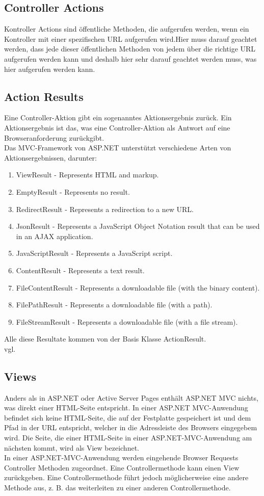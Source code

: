 {\subsection{Controller Actions}
\label{sec:controller_actions}
Kontroller Actions sind öffentliche Methoden, die aufgerufen werden, wenn ein Kontroller mit einer spezifischen URL aufgerufen wird.Hier muss darauf geachtet werden, dass jede dieser öffentlichen Methoden von jedem über die richtige URL aufgerufen werden kann und deshalb hier sehr darauf geachtet werden muss, was hier aufgerufen werden kann. 
\subsection{Action Results}
\label{sec:controller_actions_results}
Eine Controller-Aktion gibt ein sogenanntes Aktionsergebnis zurück. Ein Aktionsergebnis ist das, was eine Controller-Aktion als Antwort auf eine Browseranforderung zurückgibt.\\Das MVC-Framework von ASP.NET unterstützt verschiedene Arten von Aktionsergebnissen, darunter:
\begin{enumerate}
\item ViewResult - Represents HTML and markup.
\item EmptyResult - Represents no result.
\item RedirectResult - Represents a redirection to a new URL.
\item JsonResult - Represents a JavaScript Object Notation result that can be used in an AJAX application.
\item JavaScriptResult - Represents a JavaScript script.
\item ContentResult - Represents a text result.
\item FileContentResult - Represents a downloadable file (with the binary content).
\item FilePathResult - Represents a downloadable file (with a path).
\item FileStreamResult - Represents a downloadable file (with a file stream).
\end{enumerate}
Alle diese Resultate kommen von der Basis Klasse ActionResult.
\\ vgl. \textcite{mic_controller}
\subsection{Views}
\label{sec:Views}
Anders als in ASP.NET oder Active Server Pages enthält ASP.NET MVC nichts, was direkt einer HTML-Seite entspricht. In einer ASP.NET MVC-Anwendung befindet sich keine HTML-Seite, die auf der Festplatte gespeichert ist und dem Pfad in der URL entspricht, welcher in die Adressleiste des Browsers eingegebem wird. Die Seite, die einer HTML-Seite in einer ASP.NET-MVC-Anwendung am nächsten kommt, wird als View bezeichnet.\\
In einer ASP.NET-MVC-Anwendung werden eingehende Browser Requests Controller Methoden zugeordnet. Eine Controllermethode kann einen View zurückgeben. Eine Controllermethode führt jedoch möglicherweise eine andere Methode aus, z. B. das weiterleiten zu einer anderen Controllermethode.
}
